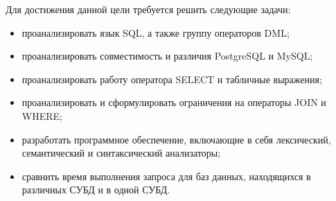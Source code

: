Для достижения данной цели требуется решить следующие задачи:
\begin{itemize}
	\item проанализировать язык SQL, а также группу операторов DML;
	\item проанализировать совместимость и различия PostgreSQL и MySQL;
	\item проанализировать работу оператора SELECT и табличные выражения;
	\item проанализировать и сформулировать ограничения на операторы JOIN и WHERE; 
	\item разработать программное обеспечение, включающие в себя лексический, семантический и синтаксический анализаторы;
	\item сравнить время выполнения запроса для баз данных, находящихся в различных СУБД и в одной СУБД.
\end{itemize}